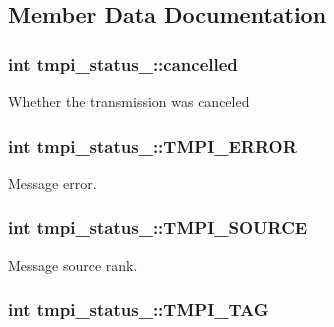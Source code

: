 \subsection{\-Member \-Data \-Documentation}
\hypertarget{structtmpi__status___afd58729d06a09f61d241dfe86222c6bc}{
\subsubsection[{cancelled}]{\setlength{\rightskip}{0pt plus 5cm}int {\bf tmpi\-\_\-status\-\_\-\-::cancelled}}}\label{structtmpi__status___afd58729d06a09f61d241dfe86222c6bc}
\-Whether the transmission was canceled \hypertarget{structtmpi__status___a15f8a622a9943b094c8da7929af28710}{
\subsubsection[{\-T\-M\-P\-I\-\_\-\-E\-R\-R\-O\-R}]{\setlength{\rightskip}{0pt plus 5cm}int {\bf tmpi\-\_\-status\-\_\-\-::\-T\-M\-P\-I\-\_\-\-E\-R\-R\-O\-R}}}\label{structtmpi__status___a15f8a622a9943b094c8da7929af28710}
\-Message error. \hypertarget{structtmpi__status___a89d1e57918721cbd8f5f64c8620178f3}{
\subsubsection[{\-T\-M\-P\-I\-\_\-\-S\-O\-U\-R\-C\-E}]{\setlength{\rightskip}{0pt plus 5cm}int {\bf tmpi\-\_\-status\-\_\-\-::\-T\-M\-P\-I\-\_\-\-S\-O\-U\-R\-C\-E}}}\label{structtmpi__status___a89d1e57918721cbd8f5f64c8620178f3}
\-Message source rank. \hypertarget{structtmpi__status___ab3476d9d636c0a7f14678c59c92daa6d}{
\subsubsection[{\-T\-M\-P\-I\-\_\-\-T\-A\-G}]{\setlength{\rightskip}{0pt plus 5cm}int {\bf tmpi\-\_\-status\-\_\-\-::\-T\-M\-P\-I\-\_\-\-T\-A\-G}}}\label{structtmpi__status___ab3476d9d636c0a7f14678c59c92daa6d}
